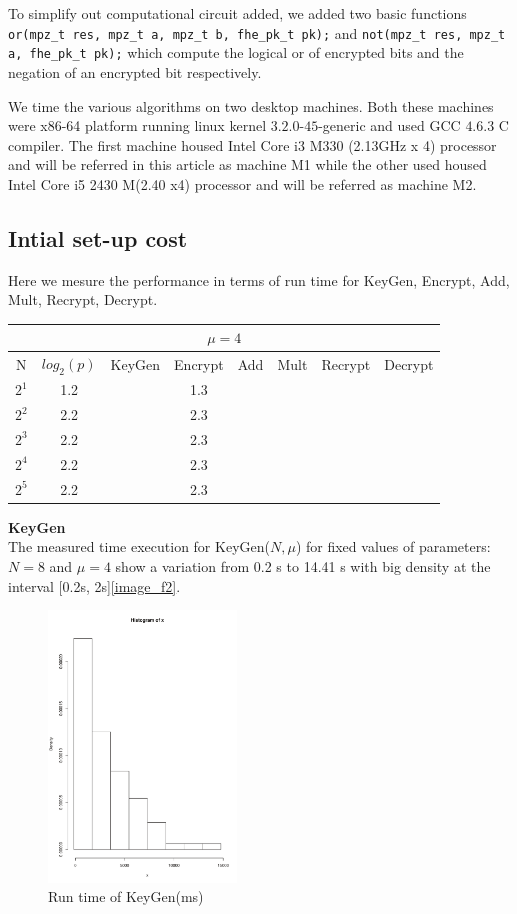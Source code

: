\documentclass{acm_proc_article-sp}
\begin{document}
To simplify out computational circuit added, we added two basic functions \texttt{or(mpz\_t res, mpz\_t a, mpz\_t b, fhe\_pk\_t pk);} and \texttt{not(mpz\_t res, mpz\_t a, fhe\_pk\_t pk);} which compute the logical or of encrypted bits and the negation of an encrypted bit respectively.

We time the various algorithms on two desktop machines. Both these machines were x86-64 platform running linux kernel $3.2.0$-$45$-generic  and used GCC $4.6.3$ C compiler.  The first machine housed Intel Core i3 M330 (2.13GHz x 4) processor and will be referred in this article as machine M1 while the other used  housed Intel Core i5 2430 M(2.40 x4) processor and will be referred as machine M2.
 
\subsection{Intial set-up cost}
Here we mesure the performance in terms of run time for KeyGen, Encrypt, Add, Mult, Recrypt, Decrypt.\\
\begin{tabular}{|c|c|c|c|c|c|c|c|}
  \hline
  \multicolumn{8}{|c|}{$\mu = 4$} \\
  \hline
  N & $log_{2}(p)$ & KeyGen & Encrypt & Add & Mult & Recrypt & Decrypt \\
  \hline
  $2^{1}$ & 1.2 & & 1.3 & & & & \\
  $2^{2}$ & 2.2 & & 2.3 & & & & \\
  $2^{3}$ & 2.2 & & 2.3 & & & & \\
  $2^{4}$ & 2.2 & & 2.3 & & & & \\
  $2^{5}$ & 2.2 & & 2.3 & & & & \\
  \hline
\end{tabular}

\textbf{KeyGen}\\
The measured time execution for KeyGen($N, \mu$)  for fixed values of parameters: $N=8$ and $\mu = 4$ show a variation from 0.2 s to 14.41 s with big density at the interval [0.2s, 2s]\autoref{image_f2}.

\begin{figure}[!h] %
\centering
\includegraphics[width=5cm]{f3.pdf} 
\caption{Run time of KeyGen(ms)} 
\label{image_f2} %
\end{figure}
\end{document}
